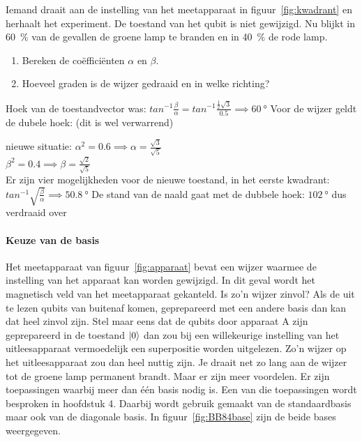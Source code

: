 \documentclass[../main.tex]{subfiles}
\begin{document}
\begin{opdracht}\label{opd:apparaat}
Iemand draait aan de instelling van het meetapparaat in figuur~\ref{fig:kwadrant} en herhaalt het experiment. De toestand van het qubit is niet gewijzigd. Nu blijkt in \SI{60}{\percent} van de gevallen de groene lamp te branden en in \SI{40}{\percent} de rode lamp.

\begin{enumerate}
\item Bereken de co\"effici\"enten $\alpha$ en $\beta$.
\item Hoeveel graden is de wijzer gedraaid en in welke richting?
\end{enumerate}
\end{opdracht}
\begin{antwoord}[-4cm]
Hoek van de toestandvector was: $tan^{-1}\tfrac{\beta}{\alpha}= tan^{-1}\tfrac{\tfrac{1}{2}\sqrt{3}}{0.5}\implies \SI{60}{\degree}$
Voor de wijzer geldt de dubele hoek: (dit is wel verwarrend)

nieuwe situatie: 
$\alpha^2=\num{0.6} \implies \alpha=\tfrac{\sqrt{3}}{\sqrt{5}}$\\
$\beta^2=\num{0.4} \implies \beta=\tfrac{\sqrt{2}}{\sqrt{5}}$\\

Er zijn vier mogelijkheden voor de nieuwe toestand, in het eerste kwadrant:
$tan^{-1}\sqrt{\tfrac{\beta}{\alpha}} \implies \SI{50.8}{\degree}$
De stand van de naald gaat met de dubbele hoek: $\SI{102}{\degree}$ dus verdraaid over 
\end{antwoord}





\paragraph{Keuze van de basis}

Het meetapparaat van figuur~\ref{fig:apparaat} bevat een wijzer waarmee de instelling van het apparaat kan worden gewijzigd. In dit geval wordt het magnetisch veld van het meetapparaat gekanteld. Is zo'n wijzer zinvol? Als de uit te lezen qubits van buitenaf komen, geprepareerd met een andere basis dan kan dat heel zinvol zijn. Stel maar eens dat de qubits door apparaat A zijn geprepareerd in de toestand $\ket{0}$ dan zou bij een willekeurige instelling van het uitleesapparaat vermoedelijk een superpositie worden uitgelezen. Zo'n wijzer op het uitleesapparaat zou dan heel nuttig zijn. Je draait net zo lang aan de wijzer tot de groene lamp permanent brandt.
Maar er zijn meer voordelen. Er zijn toepassingen waarbij meer dan \'e\'en basis nodig is. Een van die toepassingen wordt besproken in hoofdstuk 4.
Daarbij wordt gebruik gemaakt van de standaardbasis maar ook van de diagonale basis. In figuur~\ref{fig:BB84base} zijn de beide bases weergegeven.  
\end{document}
